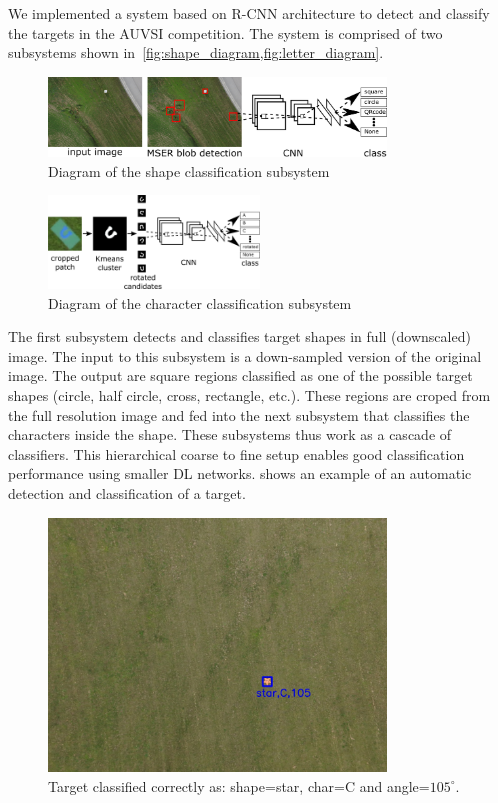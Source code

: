 \documentclass{article} %
\begin{document}
We implemented a system based on R-CNN architecture to detect and classify the
targets in the AUVSI competition. The system is comprised of two subsystems shown
in~\cref{fig:shape_diagram,fig:letter_diagram}.
\begin{figure}[h]
	\centering
	\includegraphics[width=0.8\textwidth]{diagram}
	\caption{Diagram of the shape classification subsystem}
	\label{fig:shape_diagram}
\end{figure}
\begin{figure}[h]
	\centering
	\includegraphics[width=0.5\textwidth]{letter_diagram}
	\caption{Diagram of the character classification subsystem}
	\label{fig:letter_diagram}
\end{figure}
The first subsystem detects and classifies target shapes in full (downscaled) image. The
input to this subsystem is a down-sampled version of the original image. The output
are square regions classified as one of the possible target shapes (circle, half circle,
cross, rectangle, etc.). These regions are croped from the full resolution
image and fed into the next subsystem that classifies the characters inside the shape. These subsystems
thus work as a cascade of classifiers. This hierarchical coarse to fine setup enables good
classification performance using smaller DL networks.  shows an example of
an automatic detection and classification of a target.
\begin{figure}[h]
	\centering
	\includegraphics[width=0.8\textwidth]{true_positive_correct_letter2}
	\caption{Target classified correctly as: shape=star, char=C and angle=$105^\circ$.}
	\label{fig:true_positive2}
\end{figure}
\end{document}
